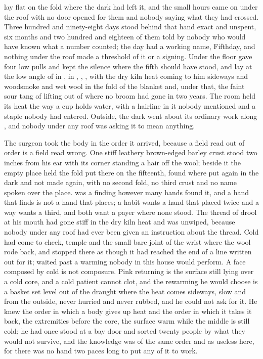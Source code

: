 
 lay flat on the fold where the dark had left it, and the small hours came on under the roof with no door opened for them and nobody saying what they had crossed. Three hundred and ninety-eight days stood behind that hand exact and unspent, six months and two hundred and eighteen of them told by nobody who would have known what a number counted; the day had a working name, Fifthday, and nothing under the roof made a threshold of it or a signing. Under the floor  gave four low pulls and kept the silence where the fifth should have stood, and  lay at the low angle of  in , in , , , with the dry kiln heat coming to him sideways and woodsmoke and wet wool in the fold of the blanket and, under that, the faint sour tang of  lifting out of  where no broom had gone in two years. The room held its heat the way a cup holds water, with a hairline in it nobody mentioned and a staple nobody had entered. Outside, the dark went about its ordinary work along , and nobody under any roof was asking it to mean anything.

The surgeon took the body in the order it arrived, because a field read out of order is a field read wrong. One stiff leathery brown-edged barley crust stood two inches from his ear with its corner standing a hair off the wool; beside it the empty place held the fold put there on the fifteenth, found where put again in the dark and not made again, with no second fold, no third crust and no name spoken over the place.  was a finding however many hands found it, and a hand that finds is not a hand that places; a habit wants a hand that placed twice and a way wants a third, and both want a payer where none stood. The thread of drool at his mouth had gone stiff in the dry kiln heat and was unwiped, because nobody under any roof had ever been given an instruction about the thread. Cold had come to cheek, temple and the small bare joint of the wrist where the wool rode back, and stopped there as though it had reached the end of a line written out for it;  waited past a warming nobody in this house would perform. A face composed by cold is not composure. Pink returning is the surface still lying over a cold core, and a cold patient cannot clot, and the rewarming he would choose is a basket set level out of the draught where the heat comes sideways, slow and from the outside, never hurried and never rubbed, and he could not ask for it. He knew the order in which a body gives up heat and the order in which it takes it back, the extremities before the core, the surface warm while the middle is still cold; he had once stood at a bay door and sorted twenty people by what they would not survive, and the knowledge was of the same order and as useless here, for there was no hand two paces long to put any of it to work.

